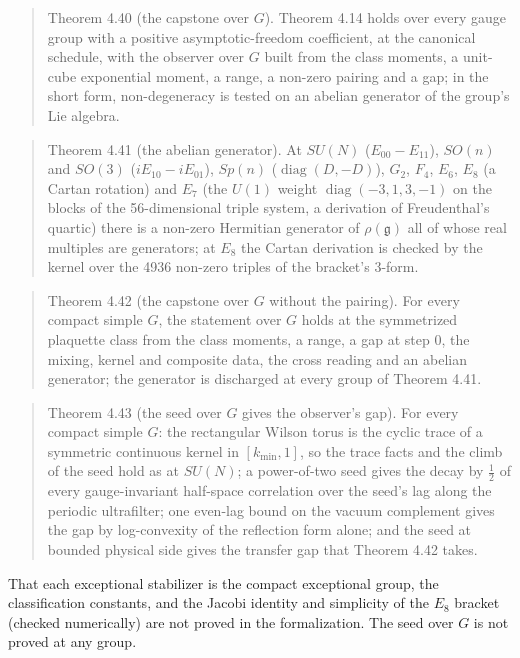 \documentclass[10pt,letterpaper,twocolumn]{article}
\begin{document}
\begin{quote}
Theorem 4.40 (the capstone over \(G\)). Theorem 4.14 holds over every gauge group with a positive asymptotic-freedom coefficient, at the canonical schedule, with the observer over \(G\) built from the class moments, a unit-cube exponential moment, a range, a non-zero pairing and a gap; in the short form, non-degeneracy is tested on an abelian generator of the group's Lie algebra.
\end{quote}

\begin{quote}
Theorem 4.41 (the abelian generator). At \(SU(N)\) (\(E_{00}-E_{11}\)), \(SO(n)\) and \(SO(3)\) (\(iE_{10}-iE_{01}\)), \(Sp(n)\) (\(\operatorname{diag}(D,-D)\)), \(G_2\), \(F_4\), \(E_6\), \(E_8\) (a Cartan rotation) and \(E_7\) (the \(U(1)\) weight \(\operatorname{diag}(-3,1,3,-1)\) on the blocks of the 56-dimensional triple system, a derivation of Freudenthal's quartic) there is a non-zero Hermitian generator of \(\rho(\mathfrak g)\) all of whose real multiples are generators; at \(E_8\) the Cartan derivation is checked by the kernel over the 4936 non-zero triples of the bracket's 3-form.
\end{quote}

\begin{quote}
Theorem 4.42 (the capstone over \(G\) without the pairing). For every compact simple \(G\), the statement over \(G\) holds at the symmetrized plaquette class from the class moments, a range, a gap at step \(0\), the mixing, kernel and composite data, the cross reading and an abelian generator; the generator is discharged at every group of Theorem 4.41.
\end{quote}

\begin{quote}
Theorem 4.43 (the seed over \(G\) gives the observer's gap). For every compact simple \(G\): the rectangular Wilson torus is the cyclic trace of a symmetric continuous kernel in \([k_{\min},1]\), so the trace facts and the climb of the seed hold as at \(SU(N)\); a power-of-two seed gives the decay by \(\tfrac12\) of every gauge-invariant half-space correlation over the seed's lag along the periodic ultrafilter; one even-lag bound on the vacuum complement gives the gap by log-convexity of the reflection form alone; and the seed at bounded physical side gives the transfer gap that Theorem 4.42 takes.
\end{quote}

That each exceptional stabilizer is the compact exceptional group, the classification constants, and the Jacobi identity and simplicity of the \(E_8\) bracket (checked numerically) are not proved in the formalization. The seed over \(G\) is not proved at any group.
\end{document}
